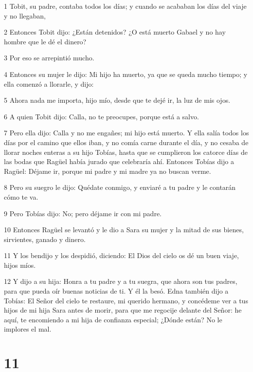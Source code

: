 \par 1 Tobit, su padre, contaba todos los días; y cuando se acababan los días del viaje y no llegaban,
\par 2 Entonces Tobit dijo: ¿Están detenidos? ¿O está muerto Gabael y no hay hombre que le dé el dinero?
\par 3 Por eso se arrepintió mucho.
\par 4 Entonces su mujer le dijo: Mi hijo ha muerto, ya que se queda mucho tiempo; y ella comenzó a llorarle, y dijo:
\par 5 Ahora nada me importa, hijo mío, desde que te dejé ir, la luz de mis ojos.
\par 6 A quien Tobit dijo: Calla, no te preocupes, porque está a salvo.
\par 7 Pero ella dijo: Calla y no me engañes; mi hijo está muerto. Y ella salía todos los días por el camino que ellos iban, y no comía carne durante el día, y no cesaba de llorar noches enteras a su hijo Tobías, hasta que se cumplieron los catorce días de las bodas que Ragüel había jurado que celebraría ahí. Entonces Tobías dijo a Ragüel: Déjame ir, porque mi padre y mi madre ya no buscan verme.
\par 8 Pero su suegro le dijo: Quédate conmigo, y enviaré a tu padre y le contarán cómo te va.
\par 9 Pero Tobías dijo: No; pero déjame ir con mi padre.
\par 10 Entonces Ragüel se levantó y le dio a Sara su mujer y la mitad de sus bienes, sirvientes, ganado y dinero.
\par 11 Y los bendijo y los despidió, diciendo: El Dios del cielo os dé un buen viaje, hijos míos.
\par 12 Y dijo a su hija: Honra a tu padre y a tu suegra, que ahora son tus padres, para que pueda oír buenas noticias de ti. Y él la besó. Edna también dijo a Tobías: El Señor del cielo te restaure, mi querido hermano, y concédeme ver a tus hijos de mi hija Sara antes de morir, para que me regocije delante del Señor: he aquí, te encomiendo a mi hija de confianza especial; ¿Dónde están? No le implores el mal.

\chapter{11}

